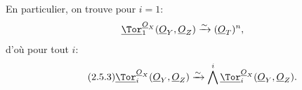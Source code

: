 En particulier, on trouve pour \(i=1\):
\[
\underline{\Tor}_1^{\underline{O}_X}(\underline{O}_Y,\underline{O}_Z)\xrightarrow{\sim}(\underline{O}_T)^n,
\]
d'où pour tout \(i\):
\begin{equation}\tag{2.5.3}
\underline{\Tor}_i^{\underline{O}_X}(\underline{O}_Y,\underline{O}_Z)
\xrightarrow{\sim}
\bigwedge^i\underline{\Tor}_i^{\underline{O}_X}(\underline{O}_Y,\underline{O}_Z).
\end{equation}

